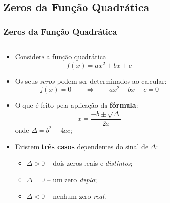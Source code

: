 \subsection{Zeros da Função Quadrática}
\begin{frame}
  \frametitle{Zeros da Função Quadrática}
  \vspace*{-0.6cm}
  \begin{columns}[onlytextwidth]
    \begin{column}{0.6\textwidth}
      \begin{itemize}
        \item Considere a função quadrática
        \begin{equation*}
          f(x) = ax^{2} + bx + c
        \end{equation*}
        \item Os seus \emph{zeros} podem ser determinados ao calcular:
        \begin{equation*}
          f(x) = 0 \qquad\Longleftrightarrow\qquad ax^{2} + bx + c = 0
        \end{equation*}
        \item O que é feito pela aplicação da \textbf{fórmula}:
        \begin{equation*}
          x = \frac{-b\pm\sqrt{\Delta}}{2a}
        \end{equation*}
        onde $\Delta = b^{2} - 4ac$;
        \item< 2- > Existem \textbf{três casos} dependentes do sinal de $\Delta$:
        \begin{itemize}
          \item< 2- > $\Delta > 0$ -- dois zeros reais e \emph{distintos};
          \item< 4- > $\Delta = 0$ -- um zero \emph{duplo};
          \item< 6- > $\Delta < 0$ -- nenhum zero \emph{real}.
        \end{itemize}
      \end{itemize}
    \end{column}
    \begin{column}{0.4\textwidth}
      \vspace*{1cm}
      \begin{figure}
      \end{figure}
    \end{column}
  \end{columns}
\end{frame}

